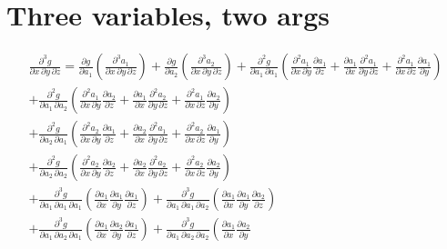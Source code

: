 \documentclass[letter]{article}
\begin{document}
\section{Three variables, two args}
\begin{multline*}
\frac{\partial^3 g}{\partial x\,\partial y\,\partial z} =
\frac{\partial g}{\partial a_1}
\left(
\frac{\partial^3 a_1}{\partial x\,\partial y\,\partial z}
\right)
+
\frac{\partial g}{\partial a_2}
\left(
\frac{\partial^3 a_2}{\partial x\,\partial y\,\partial z}
\right)
+
\frac{\partial^2 g}{\partial a_1\,\partial a_1}
\left(
\frac{\partial^2 a_1}{\partial x\,\partial y}
\frac{\partial a_1}{\partial z}
+
\frac{\partial a_1}{\partial x}
\frac{\partial^2 a_1}{\partial y\,\partial z}
+
\frac{\partial^2 a_1}{\partial x\,\partial z}
\frac{\partial a_1}{\partial y}
\right)
\\
+
\frac{\partial^2 g}{\partial a_1\,\partial a_2}
\left(
\frac{\partial^2 a_1}{\partial x\,\partial y}
\frac{\partial a_2}{\partial z}
+
\frac{\partial a_1}{\partial x}
\frac{\partial^2 a_2}{\partial y\,\partial z}
+
\frac{\partial^2 a_1}{\partial x\,\partial z}
\frac{\partial a_2}{\partial y}
\right)
\\
+
\frac{\partial^2 g}{\partial a_2\,\partial a_1}
\left(
\frac{\partial^2 a_2}{\partial x\,\partial y}
\frac{\partial a_1}{\partial z}
+
\frac{\partial a_2}{\partial x}
\frac{\partial^2 a_1}{\partial y\,\partial z}
+
\frac{\partial^2 a_2}{\partial x\,\partial z}
\frac{\partial a_1}{\partial y}
\right)
\\
+
\frac{\partial^2 g}{\partial a_2\,\partial a_2}
\left(
\frac{\partial^2 a_2}{\partial x\,\partial y}
\frac{\partial a_2}{\partial z}
+
\frac{\partial a_2}{\partial x}
\frac{\partial^2 a_2}{\partial y\,\partial z}
+
\frac{\partial^2 a_2}{\partial x\,\partial z}
\frac{\partial a_2}{\partial y}
\right)
\\
+
\frac{\partial^3 g}{\partial a_1\,\partial a_1\,\partial a_1}
\left(
\frac{\partial a_1}{\partial x}
\frac{\partial a_1}{\partial y}
\frac{\partial a_1}{\partial z}
\right)
+
\frac{\partial^3 g}{\partial a_1\,\partial a_1\,\partial a_2}
\left(
\frac{\partial a_1}{\partial x}
\frac{\partial a_1}{\partial y}
\frac{\partial a_2}{\partial z}
\right)
\\
+
\frac{\partial^3 g}{\partial a_1\,\partial a_2\,\partial a_1}
\left(
\frac{\partial a_1}{\partial x}
\frac{\partial a_2}{\partial y}
\frac{\partial a_1}{\partial z}
\right)
+
\frac{\partial^3 g}{\partial a_1\,\partial a_2\,\partial a_2}
\left(
\frac{\partial a_1}{\partial x}
\frac{\partial a_2}{\partial y}

\end{multline*}
\end{document}
